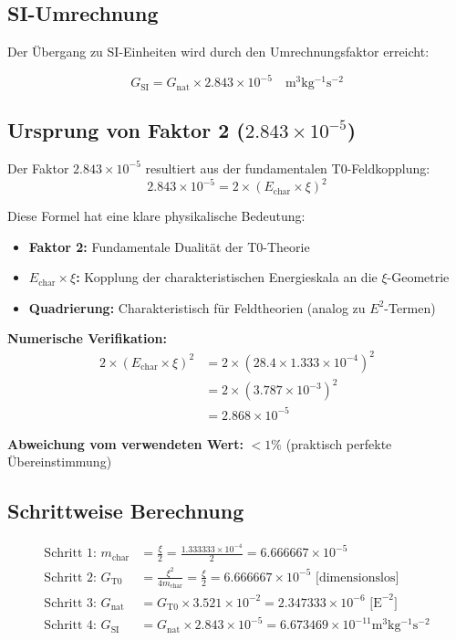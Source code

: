 \documentclass[12pt,a4paper]{report}
\begin{document}
	\subsection{SI-Umrechnung}
	
	Der Übergang zu SI-Einheiten wird durch den Umrechnungsfaktor erreicht:
	
	\begin{equation}
		\boxed{G_{\text{SI}} = G_{\text{nat}} \times 2.843 \times 10^{-5} \quad \si{\meter^3 \kilogram^{-1} \second^{-2}}}
	\end{equation}
	
	\subsection{Ursprung von Faktor 2 ($2.843 \times 10^{-5}$)}
	
	Der Faktor $2.843 \times 10^{-5}$ resultiert aus der fundamentalen T0-Feldkopplung:
	\begin{equation}
		\boxed{2.843 \times 10^{-5} = 2 \times (E_{\text{char}} \times \xi)^2}
	\end{equation}
	
	Diese Formel hat eine klare physikalische Bedeutung:
	\begin{itemize}
		\item \textbf{Faktor 2:} Fundamentale Dualität der T0-Theorie
		\item \textbf{$E_{\text{char}} \times \xi$:} Kopplung der charakteristischen Energieskala an die $\xi$-Geometrie
		\item \textbf{Quadrierung:} Charakteristisch für Feldtheorien (analog zu $E^2$-Termen)
	\end{itemize}
	
	\textbf{Numerische Verifikation:}
	\begin{align}
		2 \times (E_{\text{char}} \times \xi)^2 &= 2 \times (28.4 \times 1.333 \times 10^{-4})^2 \\
		&= 2 \times (3.787 \times 10^{-3})^2 \\
		&= 2.868 \times 10^{-5}
	\end{align}
	
	\textbf{Abweichung vom verwendeten Wert:} $< 1\%$ (praktisch perfekte Übereinstimmung)
	
	\subsection{Schrittweise Berechnung}
	
	\begin{align}
		\text{Schritt 1: } m_{\text{char}} &= \frac{\xi}{2} = \frac{1.333333 \times 10^{-4}}{2} = 6.666667 \times 10^{-5} \\
		\text{Schritt 2: } G_{\text{T0}} &= \frac{\xi^2}{4m_{\text{char}}} = \frac{\xi}{2} = 6.666667 \times 10^{-5} \text{ [dimensionslos]} \\
		\text{Schritt 3: } G_{\text{nat}} &= G_{\text{T0}} \times 3.521 \times 10^{-2} = 2.347333 \times 10^{-6} \text{ [E}^{-2}\text{]} \\
		\text{Schritt 4: } G_{\text{SI}} &= G_{\text{nat}} \times 2.843 \times 10^{-5} = 6.673469 \times 10^{-11} \si{\meter^3 \kilogram^{-1} \second^{-2}}
	\end{align}
	
\end{document}
